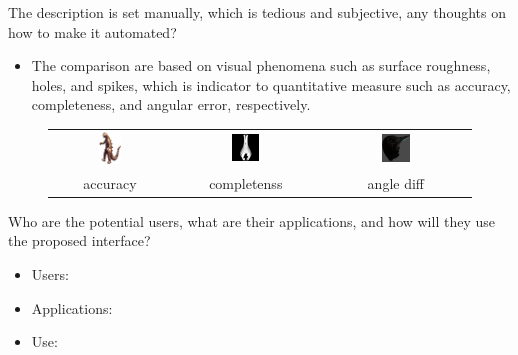 \documentclass[10pt]{beamer}
\begin{document}
\begin{frame}

\begin{alertblock}{The description is set manually, which is tedious and subjective, any thoughts on how to make it automated?}

\begin{itemize}
\item The comparison are based on visual phenomena such as surface roughness, holes, and spikes, which is indicator to quantitative measure such as accuracy, completeness, and angular error, respectively.
\end{itemize}

\end{alertblock}

\begin{figure}
\centering
\begin{tabular}{ccc}
\includegraphics[width=0.2\textwidth]{images/dino.png} &
\includegraphics[width=0.2\textwidth]{interp/synth_interp/vase0_sl} &
\includegraphics[width=0.2\textwidth]{interp/real_interp/vase/vase_spike} \\
accuracy & completenss & angle diff \\
\end{tabular}
\end{figure}

\end{frame}

\begin{frame}

\begin{alertblock}{Who are the potential users, what are their applications, and how will they use the proposed interface?}
\begin{itemize}
\item Users:
\item Applications:
\item Use:
\end{itemize}
\end{alertblock}

\end{frame}
\end{document}
